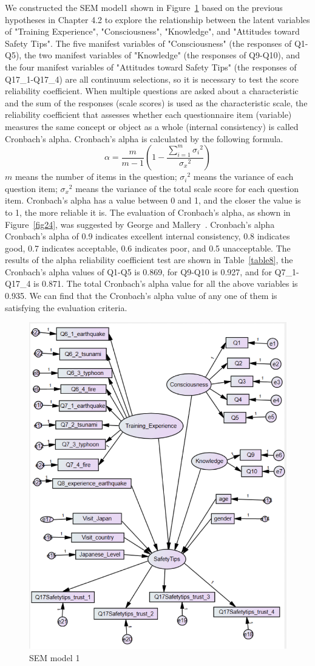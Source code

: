We constructed the SEM model1 shown in Figure~\ref{fig23} based on the previous hypotheses in Chapter 4.2 to explore the relationship between the latent variables of "Training Experience", "Consciousness", "Knowledge", and "Attitudes toward Safety Tips". The five manifest variables of "Consciousness" (the responses of Q1-Q5), the two manifest variables of "Knowledge" (the responses of Q9-Q10), and the four manifest variables of  "Attitudes toward Safety Tips" (the responses of Q17\_1-Q17\_4) are all continuum selections, so it is necessary to test the score reliability coefficient. When multiple questions are asked about a characteristic and the sum of the responses (scale scores) is used as the characteristic scale, the reliability coefficient that assesses whether each questionnaire item (variable) measures the same concept or object as a whole (internal consistency) is called Cronbach's alpha. Cronbach's alpha is calculated by the following formula. 
\begin{equation}
\alpha = \frac{m}{m-1} \left(1 - \frac{\displaystyle \sum_{i = 1}^m{{\sigma_i}^2}}{{\sigma_x}^2} \right)
\end{equation}
$m$ means the number of items in the question; ${\sigma_i}^2$ means the variance of each question item; ${\sigma_x}^2$ means the variance of the total scale score for each question item. Cronbach's alpha has a value between 0 and 1, and the closer the value is to 1, the more reliable it is. The evaluation of Cronbach's alpha, as shown in Figure~\ref{fig24}, was suggested by George and Mallery~\cite{ref1}. Cronbach's alpha  Cronbach's alpha of 0.9 indicates excellent internal consistency, 0.8 indicates good, 0.7 indicates acceptable, 0.6 indicates poor, and 0.5 unacceptable. The results of the alpha reliability coefficient test are shown in Table~\ref{table8}, the Cronbach's alpha values of Q1-Q5 is 0.869, for Q9-Q10 is 0.927, and for Q7\_1-Q17\_4 is 0.871. The total Cronbach's alpha value for all the above variables is 0.935. We can find that the Cronbach's alpha value of any one of them is satisfying the evaluation criteria.

\iffalse
\begin{figure}[h]
  \includegraphics[width=0.5\linewidth]{Figure/Figure23.jpg}
  \centering
  \caption{SEM model 1}
  \label{fig23}
\end{figure}

